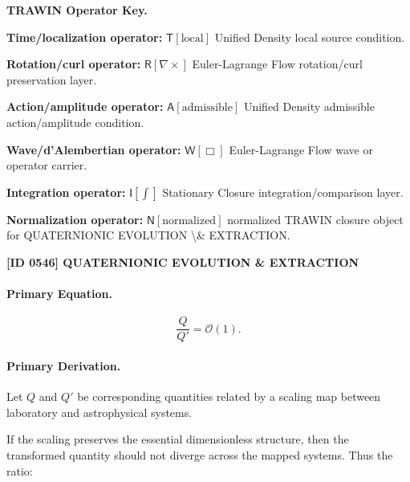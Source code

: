 \par\vspace{0.45\baselineskip}
\noindent\begin{minipage}[t]{\linewidth}
\begingroup
\small
\raggedright
\textbf{TRAWIN Operator Key.}\par
\noindent\textbf{Time/localization operator:} $\mathsf{T}\!\left[\mathrm{local}\right]$ Unified Density local source condition.\par
\noindent\textbf{Rotation/curl operator:} $\mathsf{R}\!\left[\nabla\times\right]$ Euler-Lagrange Flow rotation/curl preservation layer.\par
\noindent\textbf{Action/amplitude operator:} $\mathsf{A}\!\left[\mathrm{admissible}\right]$ Unified Density admissible action/amplitude condition.\par
\noindent\textbf{Wave/d'Alembertian operator:} $\mathsf{W}\!\left[\Box\right]$ Euler-Lagrange Flow wave or operator carrier.\par
\noindent\textbf{Integration operator:} $\mathsf{I}\!\left[\int\right]$ Stationary Closure integration/comparison layer.\par
\noindent\textbf{Normalization operator:} $\mathsf{N}\!\left[\mathrm{normalized}\right]$ normalized TRAWIN closure object for QUATERNIONIC EVOLUTION \textbackslash{}\& EXTRACTION.\par
\endgroup
\end{minipage}

\clearpage
\noindent\textbf{[ID 0546] QUATERNIONIC EVOLUTION \& EXTRACTION}\par
\vspace{0.35em}
\paragraph{Primary Equation.}
\begin{equation}
\frac{Q}{Q'}
=
\mathcal{O}(1).
\end{equation}

\paragraph{Primary Derivation.}
Let $Q$ and $Q'$ be corresponding quantities related by a scaling map between laboratory and astrophysical systems.

If the scaling preserves the essential dimensionless structure, then the transformed quantity should not diverge across the mapped systems. Thus the ratio:

